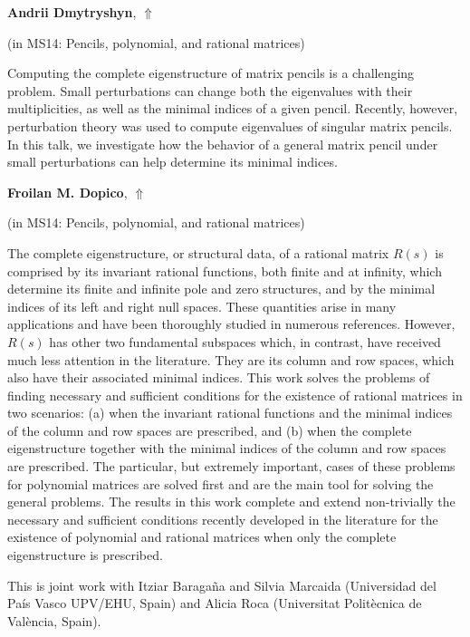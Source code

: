 \documentclass[ILAS2025-program.tex]{subfiles}
\begin{document}
\hypertarget{down0216}{}\begin{ilasabstract}
    
\textbf{Andrii Dmytryshyn},  \hfill \hyperlink{up0216}{$\Uparrow$}
    
    
(in {\color{mstitle}MS14: Pencils, polynomial, and rational matrices})
        
\mtskip
    Computing the complete eigenstructure of matrix pencils is a challenging problem. Small perturbations can change both the eigenvalues with their multiplicities, as well as the minimal indices of a given pencil. Recently, however, perturbation theory was used to compute eigenvalues of singular matrix pencils. In this talk, we investigate how the behavior of a general matrix pencil under small perturbations can help determine its minimal indices.

\end{ilasabstract}
    

\hypertarget{down0330}{}\begin{ilasabstract}
    
\textbf{Froilan M. Dopico},  \hfill \hyperlink{up0330}{$\Uparrow$}
    
    
(in {\color{mstitle}MS14: Pencils, polynomial, and rational matrices})
        
\mtskip
    The complete eigenstructure, or structural data, of a rational matrix
$R(s)$ is comprised by its invariant rational functions, both finite
and at infinity, which determine its finite and infinite pole and zero
structures, and by the minimal indices of its left and right null spaces.
These quantities arise in many applications and have been thoroughly
studied in numerous references. However, $R(s)$ has other two fundamental
subspaces which, in contrast, have received much less attention
in the literature. They are its column and row spaces, which also have
their associated minimal indices. This work solves the problems of
finding necessary and sufficient conditions for the existence of rational
matrices in two scenarios: (a) when the invariant rational functions and the minimal indices of the column and row spaces are prescribed,
and (b) when the complete eigenstructure together with the minimal
indices of the column and row spaces are prescribed. The particular,
but extremely important, cases of these problems for polynomial matrices
are solved first and are the main tool for solving the general
problems. The results in this work complete and extend non-trivially
the necessary and sufficient conditions recently developed in the literature
for the existence of polynomial and rational matrices when only
the complete eigenstructure is prescribed.

This is joint work with Itziar Baraga\~na and Silvia Marcaida (Universidad del Pa\'is Vasco UPV/EHU, Spain) and Alicia Roca (Universitat Polit\`ecnica de Val\`encia, Spain).
\end{ilasabstract}
    
\end{document}
